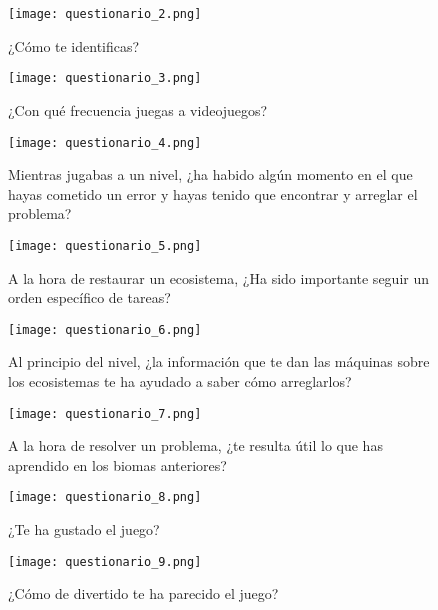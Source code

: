 \begin{figure}[H]
  \centering
  \texttt{[image: questionario\_2.png]}
  \caption{¿Cómo te identificas?}
  \label{fig:questionario_2}
\end{figure}
\raggedbottom

\begin{figure}[H]
  \centering
  \texttt{[image: questionario\_3.png]}
  \caption{¿Con qué frecuencia juegas a videojuegos?}
  \label{fig:questionario_3}
\end{figure}
\raggedbottom

\begin{figure}[H]
  \centering
  \texttt{[image: questionario\_4.png]}
  \caption{Mientras jugabas a un nivel, ¿ha habido algún momento en el que hayas cometido un error y hayas tenido que encontrar y arreglar el problema?}
  \label{fig:questionario_4}
\end{figure}
\raggedbottom

\begin{figure}[H]
  \centering
  \texttt{[image: questionario\_5.png]}
  \caption{A la hora de restaurar un ecosistema, ¿Ha sido importante seguir un orden específico de tareas?}
  \label{fig:questionario_5}
\end{figure}
\raggedbottom

\begin{figure}[H]
  \centering
  \texttt{[image: questionario\_6.png]}
  \caption{Al principio del nivel, ¿la información que te dan las máquinas sobre los ecosistemas te ha ayudado a saber cómo arreglarlos?}
  \label{fig:questionario_6}
\end{figure}
\raggedbottom

\begin{figure}[H]
  \centering
  \texttt{[image: questionario\_7.png]}
  \caption{A la hora de resolver un problema, ¿te resulta útil lo que has aprendido en los biomas anteriores?}
  \label{fig:questionario_7}
\end{figure}
\raggedbottom

\begin{figure}[H]
  \centering
  \texttt{[image: questionario\_8.png]}
  \caption{¿Te ha gustado el juego?}
  \label{fig:questionario_8}
\end{figure}
\raggedbottom

\begin{figure}[H]
  \centering
  \texttt{[image: questionario\_9.png]}
  \caption{¿Cómo de divertido te ha parecido el juego?}
  \label{fig:questionario_9}
\end{figure}
\raggedbottom


